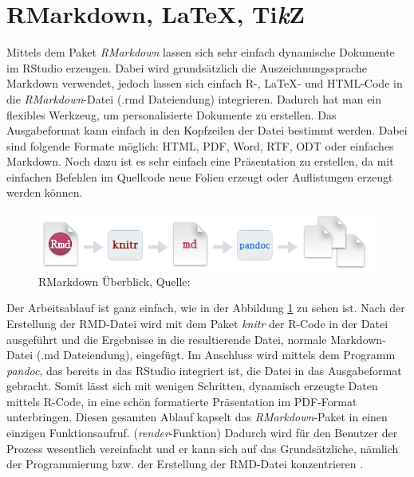 \section{RMarkdown, \LaTeX, Ti\textit{k}Z}
\label{sec:RMarkdown}
Mittels dem Paket \emph{RMarkdown} lassen sich sehr einfach dynamische Dokumente im RStudio erzeugen. Dabei wird grundsätzlich die Auszeichnungssprache Markdown verwendet, jedoch lassen sich einfach R-, \LaTeX - und HTML-Code in die \emph{RMarkdown}-Datei (.rmd Dateiendung) integrieren. Dadurch hat man ein flexibles Werkzeug, um personalisierte Dokumente zu erstellen. Das Ausgabeformat kann einfach in den Kopfzeilen der Datei bestimmt werden. Dabei sind folgende Formate möglich: HTML, PDF, Word, RTF, ODT oder einfaches Markdown. Noch dazu ist es sehr einfach eine Präsentation zu erstellen, da mit einfachen Befehlen im Quellcode neue Folien erzeugt oder Auflistungen erzeugt werden können.

\begin{figure}[t]
\centering
\includegraphics[width=\ScaleIfNeeded]{pictures/RMarkdown}
\caption{RMarkdown Überblick, Quelle: \cite{rmarkdown}}
\label{pic:RMarkdown}
\end{figure}

Der Arbeitsablauf ist ganz einfach, wie in der Abbildung \ref{pic:RMarkdown} zu sehen ist. Nach der Erstellung der RMD-Datei wird mit dem Paket \emph{knitr} der R-Code in der Datei ausgeführt und die Ergebnisse in die resultierende Datei, normale Markdown-Datei (.md Dateiendung), eingefügt. Im Anschluss wird mittels dem Programm \emph{pandoc}, das bereits in das RStudio integriert ist, die Datei in das Ausgabeformat gebracht. Somit lässt sich mit wenigen Schritten, dynamisch erzeugte Daten mittels R-Code, in eine schön formatierte Präsentation im PDF-Format unterbringen. Diesen gesamten Ablauf kapselt das \emph{RMarkdown}-Paket in einen einzigen Funktionsaufruf. (\emph{render}-Funktion) Dadurch wird für den Benutzer der Prozess wesentlich vereinfacht und er kann sich auf das Grundsätzliche, nämlich der Programmierung bzw. der Erstellung der RMD-Datei konzentrieren \cite{rmarkdown}.

